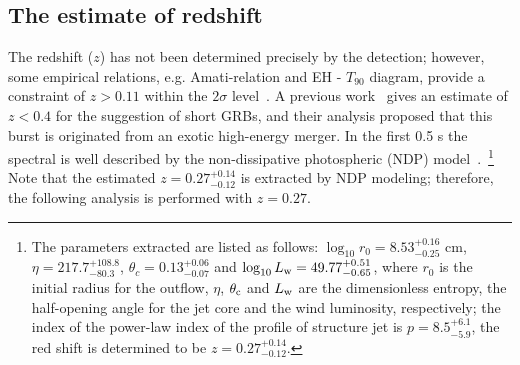 \documentclass[linenumbers,twocolumn]{aastex631}
\begin{document}
\subsection{The estimate of redshift}

The redshift ($z$) has not been determined precisely
by the detection; however, some empirical relations, e.g. Amati-relation and EH - $T_{90}$ diagram, provide a constraint of $z>0.11$ within the $2\sigma$ level~\citep{2021GCN.30452....1M}. A previous work~\citep{2023MNRAS.522.5204B} gives an estimate of $z<0.4$ for the suggestion of short GRBs, and their analysis proposed that this burst is originated from an exotic high-energy merger. In the first 0.5 s the spectral is well described by the non-dissipative photospheric (NDP) model~\citep[e.g.,][]{2013A,Deng_2014,2022MNRAS.512.5693S,2022ApJ...931..112S}.~\footnote{The parameters extracted are listed as follows: $\log_{10} r_0=8.53^{+0.16}_{-0.25}$ cm, $\eta=217.7^{+108.8}_{-80.3}$, $\theta_c=0.13^{+0.06}_{-0.07}$ and $\log_{10} L_{\rm w}=49.77^{+0.51}_{-0.65}$, where $r_0$ is the initial radius for the outflow, $\eta$, $\theta_{\rm c}$ and $L_{\rm w}$ are the dimensionless entropy, the half-opening angle for the jet core and the wind luminosity, respectively; the index of the power-law index of the profile of structure jet is $p=8.5^{+6.1}_{-5.9}$, the red shift is determined to be $z=0.27^{+0.14}_{-0.12}$.}
Note that the estimated $z=0.27^{+0.14}_{-0.12}$ is extracted by NDP modeling; therefore, the following analysis is performed with $z=0.27$.
\end{document}
